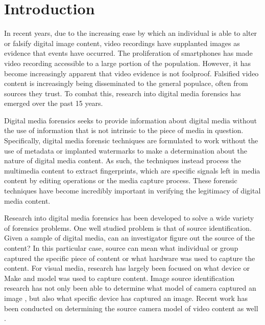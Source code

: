 \chapter{Introduction}

In recent years, due to the increasing ease by which an individual is able to alter or falsify digital image content, video recordings have supplanted images as evidence that events have occurred. The proliferation of smartphones has made video recording accessible to a large portion of the population. However, it has become increasingly apparent that video evidence is not foolproof. Falsified video content is increasingly being disseminated to the general populace, often from sources they trust. To combat this, research into digital media forensics has emerged over the past 15 years.

Digital media forensics seeks to provide information about digital media without the use of information that is not intrinsic to the piece of media in question. Specifically, digital media forensic techniques are formulated to work without the use of metadata or implanted watermarks to make a determination about the nature of digital media content. As such, the techniques instead process the multimedia content to extract fingerprints, which are specific signals left in media content by editing operations or the media capture process. These forensic techniques have become incredibly important in verifying the legitimacy of digital media content.

Research into digital media forensics has been developed to solve a wide variety of forensics problems. One well studied problem is that of source identification. Given a sample of digital media, can an investigator figure out the source of the content? In this particular case, source can mean what individual or group captured the specific piece of content or what hardware was used to capture the content. For visual media, research has largely been focused on what device or Make and model was used to capture content. Image source identification research has not only been able to determine what model of camera captured an image \cite{imagesourceid}, but also what specific device \cite{prnu} has captured an image. Recent work has been conducted on determining the source camera model of video content as well \cite{videosourceid}.

